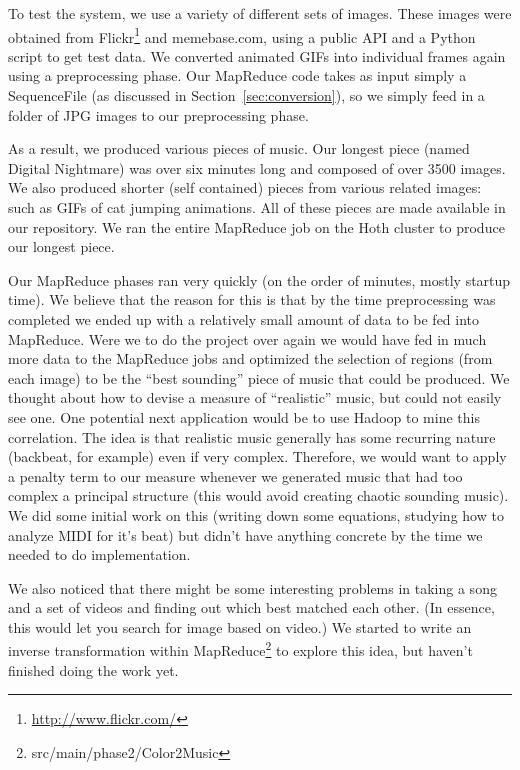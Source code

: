 \documentclass[10pt, conference, compsocconf]{IEEEtran}
\newcommand{\code}[1]{\textsf{\small #1}}
\begin{document}
To test the system, we use a variety of different sets of images.
These images were obtained from
Flickr\footnote{\url{http://www.flickr.com/}} and \code{memebase.com},
using a public API and a Python script \cite{flickerpy} to get test
data.  We converted animated GIFs into individual frames again using a
preprocessing phase.  Our MapReduce code takes as input simply a
\code{SequenceFile} (as discussed in Section~\ref{sec:conversion}), so
we simply feed in a folder of JPG images to our preprocessing phase.

As a result, we produced various pieces of music.  Our longest piece
(named \code{Digital Nightmare}) was over six minutes long and
composed of over 3500 images.  We also produced shorter (self
contained) pieces from various related images: such as GIFs of cat
jumping animations.  All of these pieces are made available in our
repository.  We ran the entire MapReduce job on the Hoth cluster to
produce our longest piece.

Our MapReduce phases ran very quickly (on the order of minutes, mostly
startup time).  We believe that the reason for this is that by the
time preprocessing was completed we ended up with a relatively small
amount of data to be fed into MapReduce.  Were we to do the project
over again we would have fed in much more data to the MapReduce jobs
and optimized the selection of regions (from each image) to be the
``best sounding'' piece of music that could be produced.  We thought
about how to devise a measure of ``realistic'' music, but could not
easily see one.  One potential next application would be to use Hadoop
to mine this correlation.  The idea is that realistic music generally
has some recurring nature (backbeat, for example) even if very
complex.  Therefore, we would want to apply a penalty term to our
measure whenever we generated music that had too complex a principal
structure (this would avoid creating chaotic sounding music).  We did
some initial work on this (writing down some equations, studying how
to analyze MIDI for it's beat) but didn't have anything concrete by
the time we needed to do implementation.

We also noticed that there might be some interesting problems in
taking a song and a set of videos and finding out which best matched
each other.  (In essence, this would let you search for image based on
video.)  We started to write an inverse transformation within
MapReduce\footnote{src/main/phase2/Color2Music} to explore this idea,
but haven't finished doing the work yet.
\end{document}
